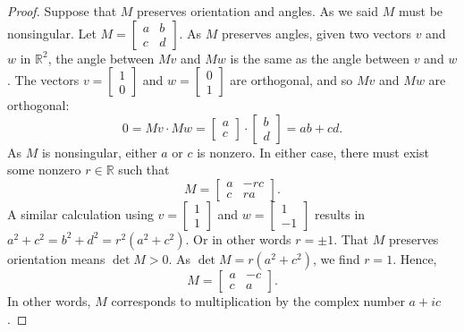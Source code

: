\documentclass[12pt,openany]{book}
\newcommand{\R}{{\mathbb{R}}}
\theoremstyle{plain}
\theoremstyle{remark}
\theoremstyle{definition}
\theoremstyle{exercise}
\theoremstyle{example}
\begin{document}
\begin{proof}
Suppose that $M$ preserves orientation and angles.
As we said $M$ must be nonsingular.
Let $M =
\left[\begin{smallmatrix}a&b\\c&d\end{smallmatrix}\right]$.
As $M$ preserves angles, given two vectors $v$ and
$w$ in $\R^2$, the angle between $Mv$ and $Mw$ is the same as the angle
between $v$ and $w$.
The vectors
$v=\left[\begin{smallmatrix}1\\0\end{smallmatrix}\right]$ and
$w=\left[\begin{smallmatrix}0\\1\end{smallmatrix}\right]$ are
orthogonal, and so $Mv$ and $Mw$ are orthogonal:
\begin{equation*}
0 = Mv \cdot Mw = 
\begin{bmatrix} a\\c \end{bmatrix}
\cdot
\begin{bmatrix} b\\d \end{bmatrix}
=
ab+cd .
\end{equation*}
As $M$ is nonsingular, either $a$ or $c$ is nonzero.  In either case,
there must exist some nonzero $r \in \R$ such that
\begin{equation*}
M =
\begin{bmatrix}
a &-rc \\
c & ra
\end{bmatrix} .
\end{equation*}
A similar calculation using
$v=\left[\begin{smallmatrix}1\\1\end{smallmatrix}\right]$ and
$w=\left[\begin{smallmatrix}1\\-1\end{smallmatrix}\right]$ results in
$a^2+c^2 = b^2+d^2 = r^2(a^2+c^2)$.  Or in other words $r=\pm 1$.
That $M$ preserves orientation means $\det M > 0$.
As $\det M = r(a^2+c^2)$, we find $r=1$.
Hence,
\begin{equation*}
M =
\begin{bmatrix}
a & -c \\
c &  a
\end{bmatrix} .
\end{equation*}
In other words, $M$ corresponds to multiplication by the complex number
$a+ic$.


\end{proof}
\end{document}
